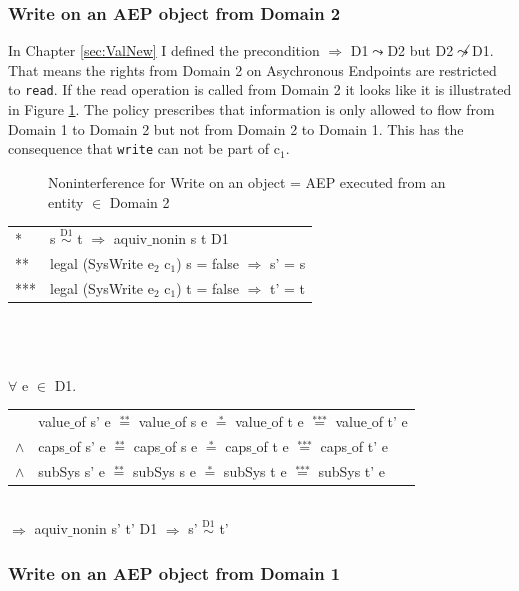 \documentclass[pdftex,11pt,a4paper,twoside]{article}
\begin{document}
\subsubsection{Write on an AEP object from Domain 2}\label{WriteOut}
In Chapter \ref{sec:ValNew} I defined the precondition $\Rightarrow$ D1$\leadsto$D2 but D2$\not\leadsto$D1. That means the rights from Domain 2 on Asychronous Endpoints are restricted to \texttt{read}. 
If the read operation is called from Domain 2 it looks like it is illustrated in Figure \ref{fig:WriteOut1}. The policy prescribes that information is only allowed to flow from Domain 1 to Domain 2 but not from Domain 2 to Domain 1. This has the consequence that \texttt{write} can not be part of c$_1$. 
\begin{flushleft}
\begin{figure}[H]
\caption{Noninterference for Write on an object = AEP executed from an entity $\in$ Domain 2}
\label{fig:WriteOut1}
\end{figure}
\end{flushleft}
\begin{tabular}{ll}
* & s $\overset{\text{D1}}{\sim}$ t $\Rightarrow$ aquiv$\_$nonin s t D1	\\ 
** & legal (SysWrite e$_2$ c$_1$) s = false $\Rightarrow$ s' = s \\ 
*** & legal (SysWrite e$_2$ c$_1$) t = false $\Rightarrow$ t' = t
\end{tabular} \\ \\ \\
$\forall$ e $\in$ D1. \\ 
\begin{tabular}{ll}
& value$\_$of s' e $\overset{\text{**}}{=}$ value$\_$of s e $\overset{\text{*}}{=}$ value$\_$of t e $\overset{\text{***}}{=}$ value$\_$of t' e \\
$\wedge$ & caps$\_$of s' e $\overset{\text{**}}{=}$ caps$\_$of s e $\overset{\text{*}}{=}$ caps$\_$of t e $\overset{\text{***}}{=}$ caps$\_$of t' e \\
$\wedge$ & subSys s' e $\overset{\text{**}}{=}$ subSys s e $\overset{\text{*}}{=}$ subSys t e $\overset{\text{***}}{=}$ subSys t' e
\end{tabular} \\
$\Rightarrow$ aquiv$\_$nonin s' t' D1 $\Rightarrow$ s' $\overset{\text{D1}}{\sim}$ t' \subsubsection{Write on an AEP object from Domain 1}\label{WriteOut2}
\end{document}
